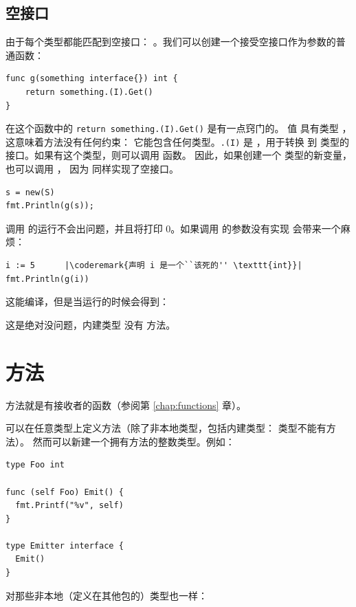 \subsection{空接口}
由于每个类型都能匹配到空接口：
。我们可以创建一个接受空接口作为参数的普通函数：
\begin{lstlisting}[caption=用空接口作为参数的函数,label=src:interface empty]
func g(something interface{}) int { 
    return something.(I).Get() 
}
\end{lstlisting}
在这个函数中的 \lstinline{return something.(I).Get()} 是有一点窍门的。
值  具有类型 ，这意味着方法没有任何约束：
它能包含任何类型。\lstinline{.(I)} 是 ，用于转换  到
 类型的接口。如果有这个类型，则可以调用  函数。
因此，如果创建一个  类型的新变量，也可以调用 ，
因为  同样实现了空接口。
\begin{lstlisting}
s = new(S)
fmt.Println(g(s));
\end{lstlisting}
调用  的运行不会出问题，并且将打印 0。如果调用  的参数没有实现  
会带来一个麻烦：
\begin{lstlisting}[caption=实现接口失败,label=src:interface fail]
i := 5		|\coderemark{声明 i 是一个``该死的'' \texttt{int}}|
fmt.Println(g(i))
\end{lstlisting}
这能编译，但是当运行的时候会得到：

\noindent{}

\noindent{}这是绝对没问题，内建类型  没有  方法。

\section{方法}
方法就是有接收者的函数（参阅第 \ref{chap:functions} 章）。

可以在任意类型上定义方法（除了非本地类型，包括内建类型： 类型不能有方法）。
然而可以新建一个拥有方法的整数类型。例如：
\begin{lstlisting}
type Foo int

func (self Foo) Emit() {
  fmt.Printf("%v", self)
}

type Emitter interface {
  Emit()
}
\end{lstlisting}
对那些非本地（定义在其他包的）类型也一样：

